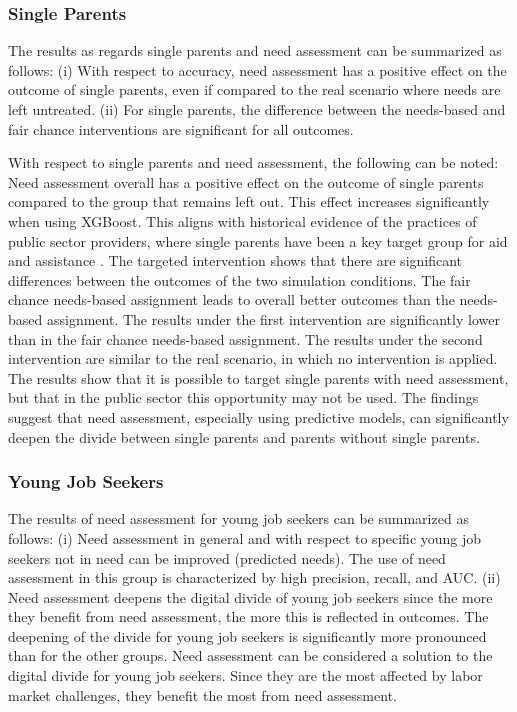 \documentclass{article} %
\begin{document}
\subsubsection{Single Parents}
\label{sec:results_singles}
The results as regards single parents and need assessment can be summarized as follows: (i) With respect to accuracy, need assessment has a positive effect on the outcome of single parents, even if compared to the real scenario where needs are left untreated. (ii) For single parents, the difference between the needs-based and fair chance interventions are significant for all outcomes.

With respect to single parents and need assessment, the following can be noted: Need assessment overall has a positive effect on the outcome of single parents compared to the group that remains left out. This effect increases significantly when using XGBoost. This aligns with historical evidence of the practices of public sector providers, where single parents have been a key target group for aid and assistance \cite{Kallus03042021, wirtz2019artificial}. The targeted intervention shows that there are significant differences between the outcomes of the two simulation conditions. The fair chance needs-based assignment leads to overall better outcomes than the needs-based assignment. The results under the first intervention are significantly lower than in the fair chance needs-based assignment. The results under the second intervention are similar to the real scenario, in which no intervention is applied. The results show that it is possible to target single parents with need assessment, but that in the public sector this opportunity may not be used. The findings suggest that need assessment, especially using predictive models, can significantly deepen the divide between single parents and parents without single parents.

\subsubsection{Young Job Seekers}
\label{sec:results_young}
The results of need assessment for young job seekers can be summarized as follows: (i) Need assessment in general and with respect to specific young job seekers not in need can be improved (predicted needs). The use of need assessment in this group is characterized by high precision, recall, and AUC. (ii) Need assessment deepens the digital divide of young job seekers since the more they benefit from need assessment, the more this is reflected in outcomes. The deepening of the divide for young job seekers is significantly more pronounced than for the other groups. Need assessment can be considered a solution to the digital divide for young job seekers. Since they are the most affected by labor market challenges, they benefit the most from need assessment.
\end{document}
